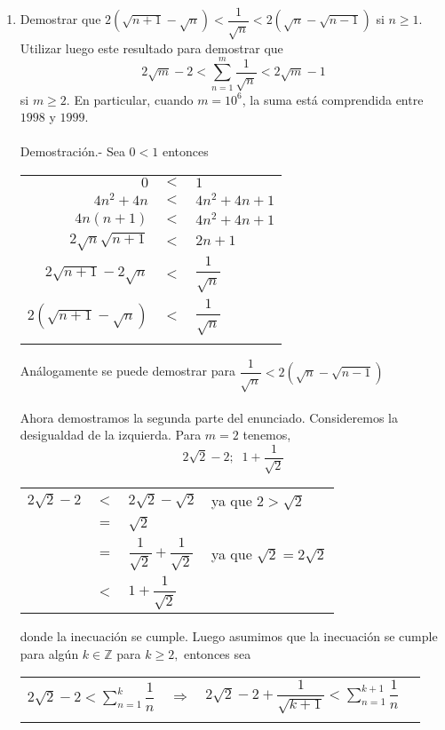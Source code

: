 \begin{enumerate}[\bfseries  1.]
\item Demostrar que $2(\sqrt{n+1} - \sqrt{n}) < \dfrac{1}{\sqrt{n}}< 2(\sqrt{n} - \sqrt{n-1})$ si $n\geq 1.$ Utilizar luego este resultado para demostrar que
$$2\sqrt{m} - 2 < \sum\limits_{n=1}^m \dfrac{1}{\sqrt{n}} < 2 \sqrt{m} - 1$$
si $m \geq 2.$ En particular, cuando $m=10^6$, la suma está comprendida entre $1998$ y $1999.$\\\\
Demostración.- \; Sea  $0<1$  entonces 
\begin{center}
\begin{tabular}{r c l}
$0$&$<$&$1$\\
$4n^2 + 4n$&$<$&$4n^2 + 4n + 1$\\
$4n(n+1)$&$<$&$4n^2 + 4n + 1$\\
$2\sqrt{n} \sqrt{n+1}$&$<$&$2n+1$\\
$2\sqrt{n+1} - 2\sqrt{n}$&$<$&$\dfrac{1}{\sqrt{n}}$\\
$2(\sqrt{n+1} - \sqrt{n})$&$<$&$\dfrac{1}{\sqrt{n}}$\\\\
\end{tabular}
\end{center} 
Análogamente se puede demostrar para $\dfrac{1}{\sqrt{n}} < 2(\sqrt{n} - \sqrt{n-1})$\\\\
Ahora demostramos la segunda parte del enunciado. Consideremos la desigualdad de la izquierda. Para $m=2$ tenemos,
$$2\sqrt{2} -2 ; \; \; 1 + \dfrac{1}{\sqrt{2}}$$ 
\begin{center}
\begin{tabular}{r c l l}
$2\sqrt{2} - 2 $&$<$&$2 \sqrt{2} - \sqrt{2}$& ya que $2 > \sqrt{2}$\\
&$=$&$\sqrt{2}$&\\
&$=$&$\dfrac{1}{\sqrt{2}} + \dfrac{1}{\sqrt{2}}$&ya que $\sqrt{2} = 2\sqrt{2}$\\
&$<$&$1 + \dfrac{1}{\sqrt{2}}$&\\
\end{tabular}
\end{center} 
donde la inecuación se cumple. Luego asumimos que la inecuación se cumple para algún $k \in \mathbb{Z}$ para $k\geq 2,$ entonces sea
\begin{center}
\begin{tabular}{r c l l}
$2\sqrt{2} -2 < \sum\limits_{n=1}^k \dfrac{1}{n}$&$\Rightarrow$&$2\sqrt{2} -2 + \dfrac{1}{\sqrt{k+1}}< \sum\limits_{n=1}^{k+1} \dfrac{1}{n}$&\\\\

\end{tabular}
\end{center}
\end{enumerate}
